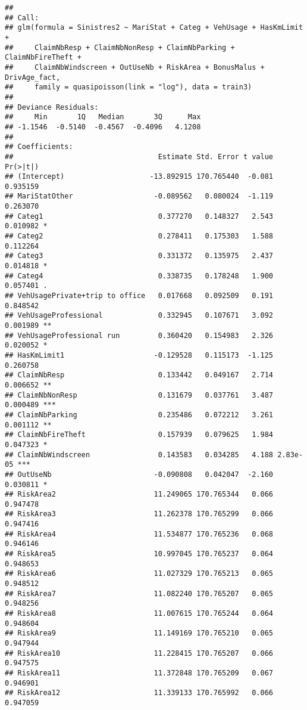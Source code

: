 \documentclass[
]{article}
\begin{document}
\begin{verbatim}
## 
## Call:
## glm(formula = Sinistres2 ~ MariStat + Categ + VehUsage + HasKmLimit + 
##     ClaimNbResp + ClaimNbNonResp + ClaimNbParking + ClaimNbFireTheft + 
##     ClaimNbWindscreen + OutUseNb + RiskArea + BonusMalus + DrivAge_fact, 
##     family = quasipoisson(link = "log"), data = train3)
## 
## Deviance Residuals: 
##     Min       1Q   Median       3Q      Max  
## -1.1546  -0.5140  -0.4567  -0.4096   4.1208  
## 
## Coefficients:
##                                  Estimate Std. Error t value Pr(>|t|)    
## (Intercept)                    -13.892915 170.765440  -0.081 0.935159    
## MariStatOther                   -0.089562   0.080024  -1.119 0.263070    
## Categ1                           0.377270   0.148327   2.543 0.010982 *  
## Categ2                           0.278411   0.175303   1.588 0.112264    
## Categ3                           0.331372   0.135975   2.437 0.014818 *  
## Categ4                           0.338735   0.178248   1.900 0.057401 .  
## VehUsagePrivate+trip to office   0.017668   0.092509   0.191 0.848542    
## VehUsageProfessional             0.332945   0.107671   3.092 0.001989 ** 
## VehUsageProfessional run         0.360420   0.154983   2.326 0.020052 *  
## HasKmLimit1                     -0.129528   0.115173  -1.125 0.260758    
## ClaimNbResp                      0.133442   0.049167   2.714 0.006652 ** 
## ClaimNbNonResp                   0.131679   0.037761   3.487 0.000489 ***
## ClaimNbParking                   0.235486   0.072212   3.261 0.001112 ** 
## ClaimNbFireTheft                 0.157939   0.079625   1.984 0.047323 *  
## ClaimNbWindscreen                0.143583   0.034285   4.188 2.83e-05 ***
## OutUseNb                        -0.090808   0.042047  -2.160 0.030811 *  
## RiskArea2                       11.249065 170.765344   0.066 0.947478    
## RiskArea3                       11.262378 170.765299   0.066 0.947416    
## RiskArea4                       11.534877 170.765236   0.068 0.946146    
## RiskArea5                       10.997045 170.765237   0.064 0.948653    
## RiskArea6                       11.027329 170.765213   0.065 0.948512    
## RiskArea7                       11.082240 170.765207   0.065 0.948256    
## RiskArea8                       11.007615 170.765244   0.064 0.948604    
## RiskArea9                       11.149169 170.765210   0.065 0.947944    
## RiskArea10                      11.228415 170.765207   0.066 0.947575    
## RiskArea11                      11.372848 170.765209   0.067 0.946901    
## RiskArea12                      11.339133 170.765992   0.066 0.947059    

\end{verbatim}
\end{document}

